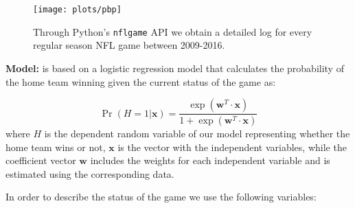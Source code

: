 \documentclass{sig-alternate}
\newcommand{\weight}{w}
\begin{document}
\begin{figure*}[t]
\begin{center}
\texttt{[image: plots/pbp]}%
 \caption{Through Python's {\tt nflgame} API we obtain a detailed log for every regular season NFL game between 2009-2016.}
 \label{fig:pbp}
\end{center}
\end{figure*}

{\bf Model: }
{\method} is based on a logistic regression model that calculates the probability of the home team winning given the current status of the game as: 

\begin{equation}
\Pr(H=1| \mathbf{x})= \frac{\exp(\mathbf{\weight}^T\cdot\mathbf{x})}{1+\exp(\mathbf{\weight}^T\cdot\mathbf{x})}
\label{eq:reg}
\end{equation}
where $H$ is the dependent random variable of our model representing whether the home team wins or not, $\mathbf{x}$ is the vector with the independent variables, while the coefficient vector $\mathbf{\weight}$ includes the weights for each independent variable and is estimated using the corresponding data.  




In order to describe the status of the game we use the following variables:
\end{document}
